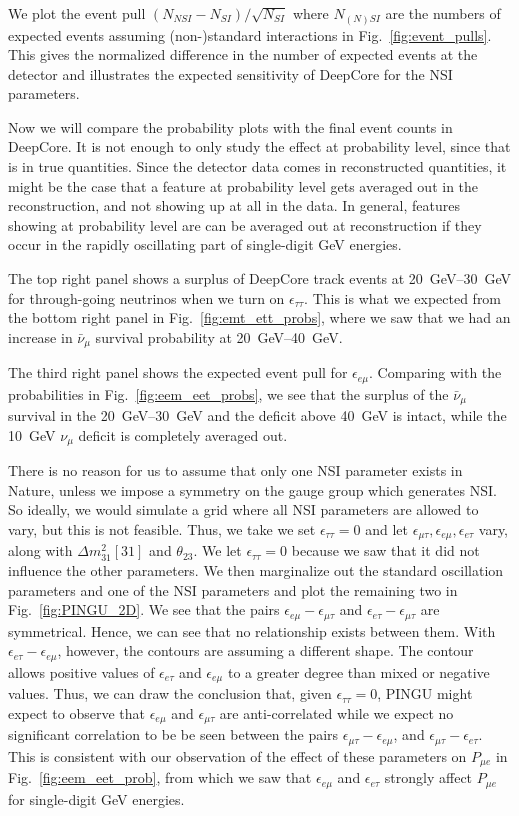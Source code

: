 \documentclass{revtex4-2}
\newcommand{\emt}{\ensuremath{\epsilon_{\mu\tau}}}
\newcommand{\eet}{\epsilon_{e\tau}}
\newcommand{\eem}{\epsilon_{e\mu}}
\newcommand{\ett}{\ensuremath{\epsilon_{\tau\tau}}}
\newcommand{\dm}{\Delta m^2_{31}}
\newcommand{\nm}{\nu_\mu}
\newcommand{\anm}{\bar\nu_\mu}
\newcommand{\Pme}{P_{\mu  e}}
\begin{document}
{{ We plot the event pull $(N_{NSI} - N_{SI})/\sqrt{N_{SI}}$ where $N_{(N)SI}$ are the numbers of expected events
 assuming (non-)standard interactions in Fig.~\ref{fig:event_pulls}. This gives the normalized difference in the
 number of expected events at the detector and illustrates the expected sensitivity of DeepCore for the NSI parameters.
 
 Now we will compare the probability plots with the final event counts in DeepCore. It is not enough to only study the effect at probability level, since that is in true quantities. 
 Since the detector data comes in reconstructed quantities, it might be the case that a feature at probability level gets averaged out in the reconstruction, and not showing up at all in the data. 
 In general, features showing at probability level are can be 
 averaged out at reconstruction if they occur in the rapidly oscillating part of single-digit \si{\GeV} energies. 
 
 The top right panel shows a surplus of DeepCore track events at \SIrange{20}{30}{\GeV} for through-going neutrinos when we turn on $\ett$. This is what we expected from the bottom right panel in Fig.~\ref{fig:emt_ett_probs}, where we saw that we had an increase in $\anm$ survival probability at \SIrange{20}{40}{\GeV}. 
 
 The third right panel shows the expected event pull for $\eem$. Comparing with the probabilities in Fig.~\ref{fig:eem_eet_probs}, we see that the surplus of the $\anm$ survival in the \SIrange{20}{30}{\GeV} and the deficit above \SI{40}{\GeV} is intact, while the \SI{10}{\GeV} $\nm$ deficit is completely averaged out.
 
 There is no reason for us to assume that only one NSI parameter exists in Nature, unless we impose a symmetry on the gauge group which generates NSI. So ideally, we would simulate a grid where all NSI parameters are allowed to vary, 
 but this is not feasible. Thus, we take we set $\ett = 0$ and let $\emt,\eem,\eet$ vary, along with $\dm[31]$ and $\theta_{23}$. We let $\ett=0$ because we saw that it did not influence the other parameters. 
 We then marginalize out the standard oscillation parameters and one of the NSI parameters and plot the remaining two in Fig.~\ref{fig:PINGU_2D}. We see that the pairs $\eem - \emt$ and $\eet - \emt$ are symmetrical. 
 Hence, we can see that no relationship exists between them. With $\eet - \eem$, however, the contours are assuming a different shape. The contour allows positive values of $\eet$ and $\eem$ to a greater degree than mixed or negative values.
 Thus, we can draw the conclusion that, given $\ett = 0$, PINGU might expect to observe that $\eem$ and $\emt$ are anti-correlated while we expect no significant correlation
 to be be seen between the pairs $\emt - \eem$, and $\emt - \eet$. This is consistent with our observation of the effect of these parameters on $\Pme$ in  Fig.~\ref{fig:eem_eet_prob}, from which we 
 saw that $\eem$ and $\eet$ strongly affect $\Pme$ for single-digit \si{\GeV} energies.
 
}}
\end{document}

